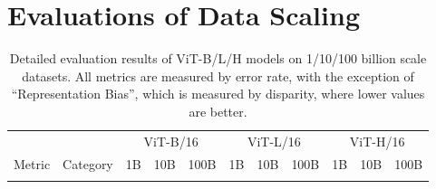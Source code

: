 \section{Evaluations of Data Scaling}
\label{appendix:data_scale}

{\footnotesize

\newcommand{\dottedline}{\multicolumn{11}{c}{\dotfill} \\}

\begin{longtable}{l|l|rrr|rrr|rrr} 
\caption{Detailed evaluation results of ViT-B/L/H models on 1/10/100 billion scale datasets. All metrics are measured by error rate, with the exception of ``Representation Bias'', which is measured by disparity, where lower values are better.}
\label{tab:data_scale} \\

\toprule
& & \multicolumn{3}{c}{ViT-B/16} & \multicolumn{3}{|c|}{ViT-L/16} & \multicolumn{3}{c}{ViT-H/16} \\
\cmidrule(lr){3-5}\cmidrule(lr){6-8}\cmidrule(lr){9-11}
Metric & Category & 1B & 10B & 100B & 1B & 10B & 100B & 1B & 10B & 100B \\ 
\midrule
\endfirsthead  %

\endhead  %

\endfoot  %

\bottomrule
\endlastfoot %


\end{longtable}}
